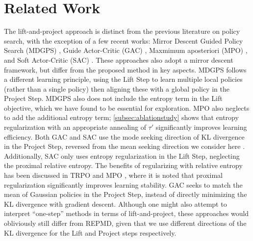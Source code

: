 
\section{Related Work}
\label{sec:related_work}

The lift-and-project approach is distinct from the previous literature on policy
search, with the exception of a few recent works:
Mirror Descent Guided Policy Search (MDGPS) \citep{montgomery2016guided},
Guide Actor-Critic (GAC) \citep{tangkaratt2017guide},
Maxmimum aposteriori (MPO) \citep{abdolmaleki2018maximum},
and Soft Actor-Critic (SAC) \citep{haarnoja2018soft}.
These approaches also adopt a mirror descent framework,
but differ from the proposed method in key aspects.
%
MDGPS \citep{montgomery2016guided} follows a different learning principle,
using the Lift Step to learn multiple local policies 
(rather than a single policy)
then aligning these with a global policy in the Project Step.
MDGPS also does not include the entropy term in the Lift objective,
which we have found to be essential for exploration. 
%
MPO \citep{abdolmaleki2018maximum} also neglects to add the additional entropy 
term;
\cref{subsec:ablationstudy} shows that entropy regularization with an
appropriate annealing of $\tau'$ significantly improves learning efficiency.
%
Both GAC and SAC use the mode seeking direction of KL divergence in
the Project Step, reversed from the mean seeking direction
we consider here \citep{tangkaratt2017guide,haarnoja2018soft}. 
Additionally, SAC only uses entropy regularization
in the Lift Step, neglecting the proximal relative entropy.
The benefits of regularizing with relative entropy
has been discussed in TRPO \citep{schulman2015trust}
and MPO \citep{abdolmaleki2018maximum},
where it is noted that proximal regularization
significantly improves learning stability.
GAC seeks to match the mean of Gaussian policies in the Project Step,
instead of directly minimizing the KL divergence with gradient descent.
%
Although one might also attempt to interpret ``one-step'' methods
in terms of lift-and-project,
these approaches would obliviously still differ from REPMD,
given that we use different directions of the KL divergence
for the Lift and Project steps respectively. 

